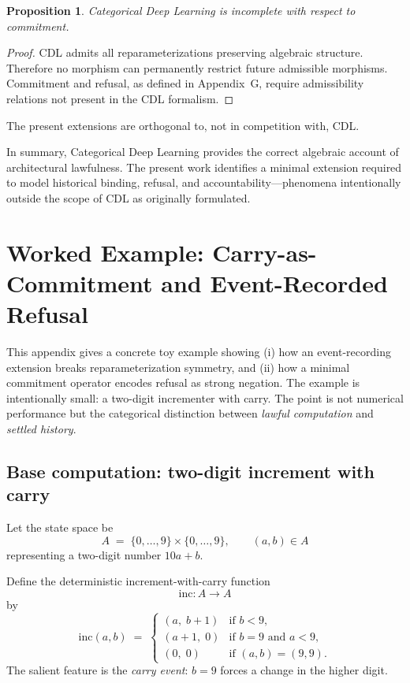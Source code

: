 \documentclass[11pt]{article}
\newtheorem{proposition}{Proposition}
\begin{document}
\begin{proposition}
Categorical Deep Learning is incomplete with respect to commitment.
\end{proposition}

\begin{proof}
CDL admits all reparameterizations preserving algebraic structure. Therefore no
morphism can permanently restrict future admissible morphisms. Commitment and
refusal, as defined in Appendix~G, require admissibility relations not present in
the CDL formalism.
\end{proof}

\begin{corollary}
The present extensions are orthogonal to, not in competition with, CDL.
\end{corollary}

In summary, Categorical Deep Learning provides the correct algebraic account of
architectural lawfulness. The present work identifies a minimal extension
required to model historical binding, refusal, and accountability—phenomena
intentionally outside the scope of CDL as originally formulated.

\appendix
\section{Worked Example: Carry-as-Commitment and Event-Recorded Refusal}

This appendix gives a concrete toy example showing (i) how an event-recording
extension breaks reparameterization symmetry, and (ii) how a minimal commitment
operator encodes refusal as strong negation. The example is intentionally small:
a two-digit incrementer with carry. The point is not numerical performance but
the categorical distinction between \emph{lawful computation} and \emph{settled
history}.

\subsection{Base computation: two-digit increment with carry}

Let the state space be
\[
A \;=\; \{0,\dots,9\}\times\{0,\dots,9\},
\qquad
(a,b)\in A
\]
representing a two-digit number $10a+b$.

Define the deterministic increment-with-carry function
\[
\mathrm{inc}:A\to A
\]
by
\[
\mathrm{inc}(a,b)\;=\;
\begin{cases}
(a,\;b+1) & \text{if } b<9,\\
(a+1,\;0) & \text{if } b=9 \text{ and } a<9,\\
(0,\;0) & \text{if } (a,b)=(9,9).
\end{cases}
\]
The salient feature is the \emph{carry event}: $b=9$ forces a change in the
higher digit.
\end{document}
